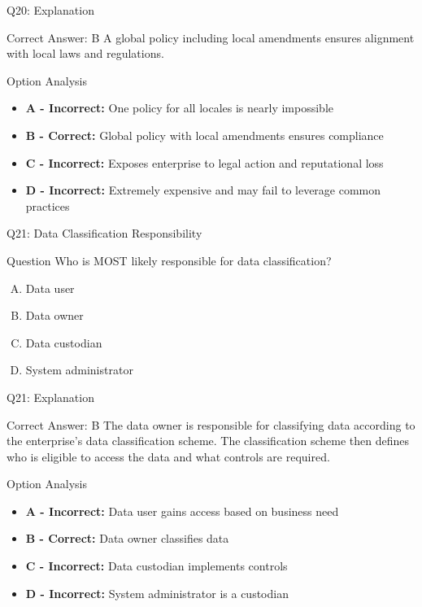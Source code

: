 \documentclass{beamer}
\begin{document}
	\begin{frame}{Q20: Explanation}
		\begin{block}{Correct Answer: B}
			A global policy including local amendments ensures alignment with local laws and regulations.
		\end{block}
		\begin{block}{Option Analysis}
			\begin{itemize}
				\item \textbf{A - Incorrect:} One policy for all locales is nearly impossible
				\item \textbf{B - Correct:} Global policy with local amendments ensures compliance
				\item \textbf{C - Incorrect:} Exposes enterprise to legal action and reputational loss
				\item \textbf{D - Incorrect:} Extremely expensive and may fail to leverage common practices
			\end{itemize}
		\end{block}
	\end{frame}
	
	\begin{frame}{Q21: Data Classification Responsibility}
		\begin{block}{Question}
			Who is MOST likely responsible for data classification?
		\end{block}
		\begin{enumerate}[(A)]
			\item Data user
			\item Data owner
			\item Data custodian
			\item System administrator
		\end{enumerate}
	\end{frame}
	
	\begin{frame}{Q21: Explanation}
		\begin{block}{Correct Answer: B}
			The data owner is responsible for classifying data according to the enterprise's data classification scheme. The classification scheme then defines who is eligible to access the data and what controls are required.
		\end{block}
		\begin{block}{Option Analysis}
			\begin{itemize}
				\item \textbf{A - Incorrect:} Data user gains access based on business need
				\item \textbf{B - Correct:} Data owner classifies data
				\item \textbf{C - Incorrect:} Data custodian implements controls
				\item \textbf{D - Incorrect:} System administrator is a custodian
			\end{itemize}
		\end{block}
	\end{frame}
	
\end{document}
